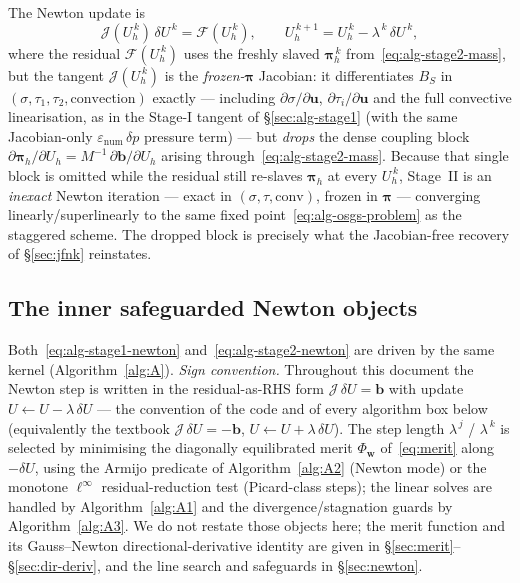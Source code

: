 \documentclass{article}
\begin{document}
The Newton update is
\begin{equation}
    \label{eq:alg-stage2-newton}
    \mathcal{J}(U_h^{\,k})\,\delta U^{\,k}
        = \mathcal{F}(U_h^{\,k}),
    \qquad
    U_h^{\,k+1} = U_h^{\,k} - \lambda^{\,k}\,\delta U^{\,k},
\end{equation}
where the residual $\mathcal{F}(U_h^{\,k})$ uses the freshly slaved
$\boldsymbol{\pi}_h^{\,k}$ from~\eqref{eq:alg-stage2-mass}, but the tangent
$\mathcal{J}(U_h^{\,k})$ is the \emph{frozen-$\boldsymbol{\pi}$} Jacobian:
it differentiates $B_S$ in $(\sigma, \tau_1, \tau_2, \text{convection})$
exactly --- including $\partial\sigma/\partial\boldsymbol{u}$,
$\partial\tau_i/\partial\boldsymbol{u}$ and the full convective linearisation,
as in the Stage-I tangent of §\ref{sec:alg-stage1} (with the same
Jacobian-only $\varepsilon_{\mathrm{num}}\,\delta p$ pressure term) --- but \emph{drops} the dense coupling
block $\partial\boldsymbol{\pi}_h/\partial U_h = M^{-1}\,\partial\boldsymbol{b}/\partial U_h$
arising through~\eqref{eq:alg-stage2-mass}. Because that single block is
omitted while the residual still re-slaves $\boldsymbol{\pi}_h$ at every
$U_h^{\,k}$, Stage~II is an \emph{inexact} Newton iteration --- exact in
$(\sigma,\tau,\text{conv})$, frozen in $\boldsymbol{\pi}$ --- converging
linearly/superlinearly to the same fixed point~\eqref{eq:alg-osgs-problem}
as the staggered scheme. The dropped block is precisely what the
Jacobian-free recovery of §\ref{sec:jfnk} reinstates.

\subsection{The inner safeguarded Newton objects}
\label{sec:alg-inner}

Both~\eqref{eq:alg-stage1-newton} and~\eqref{eq:alg-stage2-newton} are
driven by the same kernel (Algorithm~\ref{alg:A}). \emph{Sign convention.}
Throughout this document the Newton step is written in the residual-as-RHS
form $\mathcal{J}\,\delta U = \boldsymbol{b}$ with update
$U \leftarrow U - \lambda\,\delta U$ --- the convention of the code and of
every algorithm box below (equivalently the textbook
$\mathcal{J}\,\delta U = -\boldsymbol{b}$, $U \leftarrow U + \lambda\,\delta U$).
The step length
$\lambda^{\,j}$ / $\lambda^{\,k}$ is selected by minimising the diagonally
equilibrated merit $\Phi_{\boldsymbol{w}}$ of~\eqref{eq:merit} along
$-\delta U$, using the Armijo predicate of Algorithm~\ref{alg:A2}
(Newton mode) or the monotone $\ell^\infty$ residual-reduction test
(Picard-class steps); the linear solves are handled by
Algorithm~\ref{alg:A1} and the divergence/stagnation guards by
Algorithm~\ref{alg:A3}. We do not restate those objects here; the merit
function and its Gauss--Newton directional-derivative identity are given
in §\ref{sec:merit}--§\ref{sec:dir-deriv}, and the line search and
safeguards in §\ref{sec:newton}.
\end{document}

